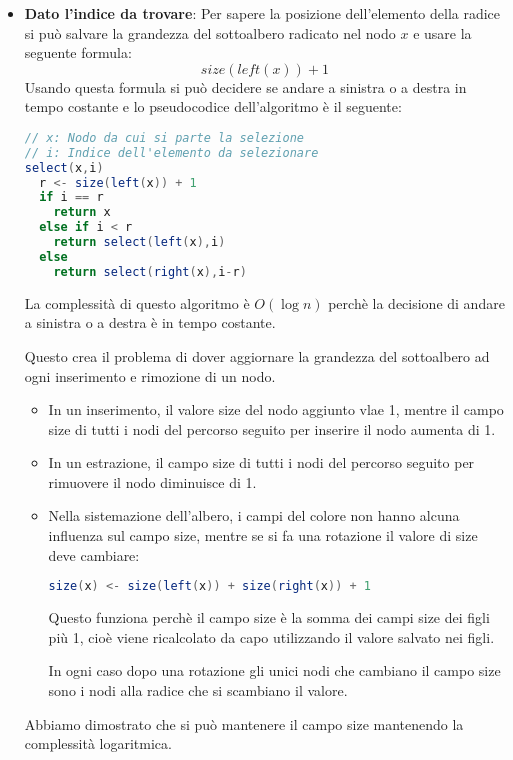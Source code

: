 \documentclass[a4paper]{article}
\begin{document}
\begin{itemize}
  \begin{itemize}
    \item \textbf{Dato l'indice da trovare}:
      \vspace{1em}
      \noindent
      Per sapere la posizione dell'elemento della radice si può salvare la grandezza del
      sottoalbero radicato nel nodo \( x \) e usare la seguente formula:
      \[
        size(left(x)) + 1
      \] 
      Usando questa formula si può decidere se andare a sinistra o a destra in tempo costante
      e lo pseudocodice dell'algoritmo è il seguente:
\begin{lstlisting}[language=Scala]
// x: Nodo da cui si parte la selezione
// i: Indice dell'elemento da selezionare
select(x,i)
  r <- size(left(x)) + 1
  if i == r
    return x
  else if i < r
    return select(left(x),i)
  else
    return select(right(x),i-r)
    \end{lstlisting}
    La complessità di questo algoritmo è \( O(\log n) \) perchè la decisione di andare
    a sinistra o a destra è in tempo costante.

    \vspace{1em}
    \noindent
    Questo crea il problema di dover aggiornare la grandezza del sottoalbero ad ogni
    inserimento e rimozione di un nodo.
    \begin{itemize}
      \item In un inserimento, il valore size del nodo aggiunto vlae 1, mentre il campo size
        di tutti i nodi del percorso seguito per inserire il nodo aumenta di 1.
      \item In un estrazione, il campo size di tutti i nodi del percorso seguito per rimuovere
        il nodo diminuisce di 1.
      \item Nella sistemazione dell'albero, i campi del colore non hanno alcuna influenza
        sul campo size, mentre se si fa una rotazione il valore di size deve cambiare:
\begin{lstlisting}[language=Scala]
size(x) <- size(left(x)) + size(right(x)) + 1
      \end{lstlisting}
      Questo funziona perchè il campo size è la somma dei campi size dei figli più 1,
      cioè viene ricalcolato da capo utilizzando il valore salvato nei figli.

      In ogni caso dopo una rotazione gli unici nodi che cambiano il campo size sono
      i nodi alla radice che si scambiano il valore.
  \end{itemize}
  Abbiamo dimostrato che si può mantenere il campo size mantenendo la complessità
  logaritmica.


\end{itemize}
\end{itemize}
\end{document}

